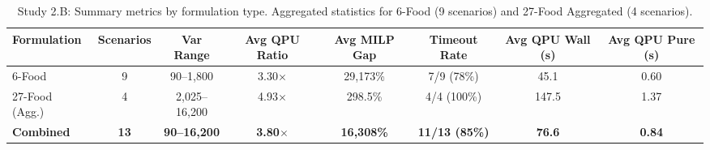 \documentclass{oqireport}
\begin{document}
\begin{table}[H]
\centering
\caption{Study 2.B: Summary metrics by formulation type. Aggregated statistics for 6-Food (9 scenarios) and 27-Food Aggregated (4 scenarios).}
\label{tab:study2b_formulation_summary}
\small
\begin{adjustbox}{max width=\textwidth}
\begin{tabular}{l c c c c c c c}
\toprule
\textbf{Formulation} & \textbf{Scenarios} & \textbf{Var Range} & \textbf{Avg QPU Ratio} & \textbf{Avg MILP Gap} & \textbf{Timeout Rate} & \textbf{Avg QPU Wall (s)} & \textbf{Avg QPU Pure (s)} \\
\midrule
6-Food & 9 & 90--1,800 & 3.30$\times$ & 29,173\% & 7/9 (78\%) & 45.1 & 0.60 \\
27-Food (Agg.) & 4 & 2,025--16,200 & 4.93$\times$ & 298.5\% & 4/4 (100\%) & 147.5 & 1.37 \\
\midrule
\textbf{Combined} & \textbf{13} & \textbf{90--16,200} & \textbf{3.80$\times$} & \textbf{16,308\%} & \textbf{11/13 (85\%)} & \textbf{76.6} & \textbf{0.84} \\
\bottomrule
\end{tabular}
\end{adjustbox}
\end{table}
\end{document}

